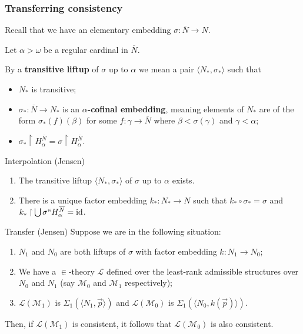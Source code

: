 \documentclass[utf8x,xcolor=svgnames,8pt]{beamer}
\newcommand{\M}{\mathcal{M}}
\newcommand{\N}{{\overline{N}}}
\newcommand{\id}{\textup{\ensuremath{\text{id}}}}
\newcommand{\To}{\longrightarrow}
\newcommand{\rest}{\mathbin{\upharpoonright}}
\begin{document}
\begin{frame} \frametitle{Transferring consistency}

Recall that we have an elementary embedding $\sigma:\N \To N$. 

Let $\alpha > \omega$ be a regular cardinal in $\N$. 

\vspace{1em}

By a \textbf{transitive liftup} of $\sigma$ up to $\alpha$ we mean a pair $\langle N_* , \sigma_* \rangle$ such that 
\begin{itemize} 
	\item $N_*$ is transitive;
	\item $\sigma_*:\N \To N_*$ is an \textbf{$\alpha$-cofinal embedding}, meaning elements of $N_*$ are of the form $\sigma_*(f)(\beta)$ for some $f: \gamma \To \N$ where $\beta < \sigma(\gamma)$ and $\gamma<\alpha$;
	\item $\sigma_* \upharpoonright H_{\alpha}^{\N}= \sigma \upharpoonright H_{\alpha}^{\N}$. 
\end{itemize}

\begin{block}{Interpolation (Jensen)}
\begin{enumerate}
	\item The transitive liftup $\langle N_*, \sigma_* \rangle$ of $\sigma$ up to $\alpha$ exists.
	\item There is a unique factor embedding $k_*:N_*  \To N$ such that $k_* \circ \sigma_* = \sigma$ and $k_* \rest \bigcup \sigma `` H^{\N}_\alpha = \id$.
\end{enumerate}
\end{block} 

\begin{block}{Transfer (Jensen)}
Suppose we are in the following situation:
\begin{enumerate}
	\item $N_1$ and $N_0$ are both liftups of $\sigma$ with factor embedding $k: N_1 \To N_0$;
	\item We have a $\in$-theory $\mathcal L$ defined over the least-rank admissible structures over $N_0$ and $N_1$ (say $\mathcal M_0$ and $\mathcal M_1$ respectively);
	\item $\mathcal L(\M_1)$ is $\Sigma_1(\langle N_1, \vec{p}\rangle)$ and $\mathcal L(\M_0)$ is $\Sigma_1(\langle N_0, k(\vec p) \rangle)$.
\end{enumerate}
Then, 
if $\mathcal L(\mathcal M_1)$ is consistent, it follows that $\mathcal L(\mathcal M_0)$ is also consistent. 
\end{block} 

\end{frame}
\end{document}
